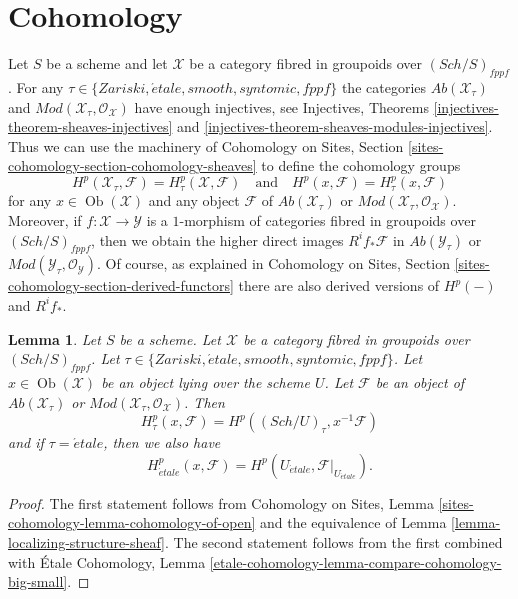\documentclass{stacks-project}
\theoremstyle{plain}
\newtheorem{lemma}[subsection]{Lemma}
\theoremstyle{definition}
\theoremstyle{remark}
\numberwithin{equation}{subsection}
\def\Sch{\mathit{Sch}}
\def\Ob{\mathop{\mathrm{Ob}}\nolimits}
\def\etale{{\acute{e}tale}}
\begin{document}
\section{Cohomology}
\label{section-cohomology-general}

\noindent
Let $S$ be a scheme and let $\mathcal{X}$ be a category fibred in groupoids
over $(\Sch/S)_{fppf}$. For any $\tau \in \{Zariski, \etale, smooth,
syntomic, fppf\}$ the categories $\textit{Ab}(\mathcal{X}_\tau)$ and
$\textit{Mod}(\mathcal{X}_\tau, \mathcal{O}_\mathcal{X})$ have
enough injectives, see
Injectives, Theorems \ref{injectives-theorem-sheaves-injectives} and
\ref{injectives-theorem-sheaves-modules-injectives}.
Thus we can use the machinery of
Cohomology on Sites, Section \ref{sites-cohomology-section-cohomology-sheaves}
to define the cohomology groups
$$
H^p(\mathcal{X}_\tau, \mathcal{F}) = H^p_\tau(\mathcal{X}, \mathcal{F})
\quad\text{and}\quad
H^p(x, \mathcal{F}) = H^p_\tau(x, \mathcal{F})
$$
for any $x \in \Ob(\mathcal{X})$ and any object $\mathcal{F}$ of
$\textit{Ab}(\mathcal{X}_\tau)$ or
$\textit{Mod}(\mathcal{X}_\tau, \mathcal{O}_\mathcal{X})$. Moreover, if
$f : \mathcal{X} \to \mathcal{Y}$ is a $1$-morphism of categories fibred
in groupoids over $(\Sch/S)_{fppf}$, then we obtain the higher direct
images $R^if_*\mathcal{F}$ in $\textit{Ab}(\mathcal{Y}_\tau)$ or
$\textit{Mod}(\mathcal{Y}_\tau, \mathcal{O}_\mathcal{Y})$.
Of course, as explained in
Cohomology on Sites, Section \ref{sites-cohomology-section-derived-functors}
there are also derived versions of $H^p(-)$ and $R^if_*$.

\begin{lemma}
\label{lemma-cohomology-restriction}
Let $S$ be a scheme. Let $\mathcal{X}$ be a category fibred in groupoids
over $(\Sch/S)_{fppf}$. Let $\tau \in \{Zariski, \etale, smooth,
syntomic, fppf\}$. Let $x \in \Ob(\mathcal{X})$ be an object lying
over the scheme $U$. Let $\mathcal{F}$ be
an object of $\textit{Ab}(\mathcal{X}_\tau)$ or
$\textit{Mod}(\mathcal{X}_\tau, \mathcal{O}_\mathcal{X})$. Then
$$
H^p_\tau(x, \mathcal{F}) = H^p((\Sch/U)_\tau, x^{-1}\mathcal{F})
$$
and if $\tau = \etale$, then we also have
$$
H^p_\etale(x, \mathcal{F}) =
H^p(U_\etale, \mathcal{F}|_{U_\etale}).
$$
\end{lemma}

\begin{proof}
The first statement follows from
Cohomology on Sites, Lemma \ref{sites-cohomology-lemma-cohomology-of-open}
and the equivalence of 
Lemma \ref{lemma-localizing-structure-sheaf}.
The second statement follows from the first combined with
\'Etale Cohomology, Lemma
\ref{etale-cohomology-lemma-compare-cohomology-big-small}.
\end{proof}
\end{document}
